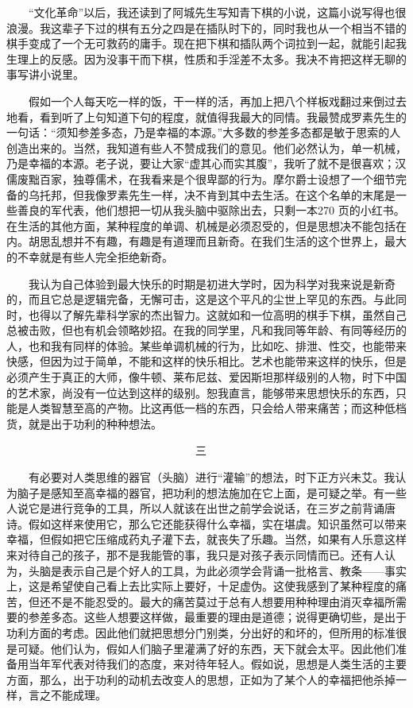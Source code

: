 　　“文化革命”以后，我还读到了阿城先生写知青下棋的小说，这篇小说写得也很浪漫。我这辈子下过的棋有五分之四是在插队时下的，同时我也从一个相当不错的棋手变成了一个无可救药的庸手。现在把下棋和插队两个词拉到一起，就能引起我生理上的反感。因为没事干而下棋，性质和手淫差不太多。我决不肯把这样无聊的事写讲小说里。 

　　假如一个人每天吃一样的饭，干一样的活，再加上把八个样板戏翻过来倒过去地看，看到听了上句知道下句的程度，就值得我最大的同情。我最赞成罗素先生的一句话：“须知参差多态，乃是幸福的本源。”大多数的参差多态都是敏于思索的人创造出来的。当然，我知道有些人不赞成我们的意见。他们必然认为，单一机械，乃是幸福的本源。老子说，要让大家“虚其心而实其腹”，我听了就不是很喜欢；汉儒废黜百家，独尊儒术，在我看来是个很卑鄙的行为。摩尔爵士设想了一个细节完备的乌托邦，但我像罗素先生一样，决不肯到其中去生活。在这个名单的末尾是一些善良的军代表，他们想把一切从我头脑中驱除出去，只剩一本270 页的小红书。在生活的其他方面，某种程度的单调、机械是必须忍受的，但是思想决不能包括在内。胡思乱想并不有趣，有趣是有道理而且新奇。在我们生活的这个世界上，最大的不幸就是有些人完全拒绝新奇。 

　　我认为自己体验到最大快乐的时期是初进大学时，因为科学对我来说是新奇的，而且它总是逻辑完备，无懈可击，这是这个平凡的尘世上罕见的东西。与此同时，也得以了解先辈科学家的杰出智力。这就如和一位高明的棋手下棋，虽然自己总被击败，但也有机会领略妙招。在我的同学里，凡和我同等年龄、有同等经历的人，也和我有同样的体验。某些单调机械的行为，比如吃、排泄、性交，也能带来快感，但因为过于简单，不能和这样的快乐相比。艺术也能带来这样的快乐，但是必须产生于真正的大师，像牛顿、莱布尼兹、爱因斯坦那样级别的人物，时下中国的艺术家，尚没有一位达到这样的级别。恕我直言，能够带来思想快乐的东西，只能是人类智慧至高的产物。比这再低一档的东西，只会给人带来痛苦；而这种低档货，就是出于功利的种种想法。 


　　　　　　　　　　　　　　　　　三　　　　　　　　　　　　　　　　　 

　　有必要对人类思维的器官（头脑）进行“灌输”的想法，时下正方兴未艾。我认为脑子是感知至高幸福的器官，把功利的想法施加在它上面，是可疑之举。有一些人说它是进行竞争的工具，所以人就该在出世之前学会说话，在三岁之前背诵唐诗。假如这样来使用它，那么它还能获得什么幸福，实在堪虞。知识虽然可以带来幸福，但假如把它压缩成药丸子灌下去，就丧失了乐趣。当然，如果有人乐意这样来对待自己的孩子，那不是我能管的事，我只是对孩子表示同情而已。还有人认为，头脑是表示自己是个好人的工具，为此必须学会背诵一批格言、教条——事实上，这是希望使自己看上去比实际上要好，十足虚伪。这使我感到了某种程度的痛苦，但还不是不能忍受的。最大的痛苦莫过于总有人想要用种种理由消灭幸福所需要的参差多态。这些人想要这样做，最重要的理由是道德；说得更确切些，是出于功利方面的考虑。因此他们就把思想分门别类，分出好的和坏的，但所用的标准很是可疑。他们认为，假如人们脑子里灌满了好的东西，天下就会太平。因此他们准备用当年军代表对待我们的态度，来对待年轻人。假如说，思想是人类生活的主要方面，那么，出于功利的动机去改变人的思想，正如为了某个人的幸福把他杀掉一样，言之不能成理。 

